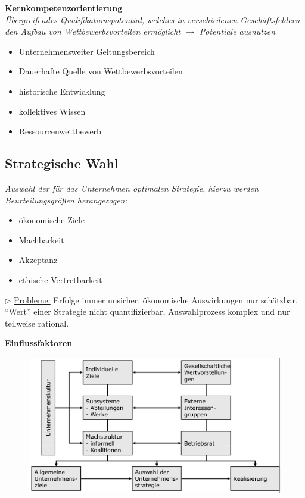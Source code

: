 \documentclass[a4paper,11pt, twoside]{article}
\begin{document}
\textbf{Kernkompetenzorientierung}\\ 
\textit{Übergreifendes Qualifikationspotential, welches in verschiedenen Geschäftsfeldern den Aufbau von Wettbewerbsvorteilen ermöglicht $\rightarrow$ Potentiale ausnutzen}
\begin{itemize}
	\item Unternehmensweiter Geltungsbereich
	\item Dauerhafte Quelle von Wettbewerbsvorteilen
	\item historische Entwicklung
	\item kollektives Wissen
	\item Ressourcenwettbewerb
\end{itemize}

\subsection{Strategische Wahl}
\textit{Auswahl der für das Unternehmen optimalen Strategie, hierzu werden Beurteilungsgrößen herangezogen:}
\begin{itemize}
	\item ökonomische Ziele
	\item Machbarkeit
	\item Akzeptanz
	\item ethische Vertretbarkeit
\end{itemize}
$\triangleright$ \underline{Probleme:} Erfolge immer unsicher, ökonomische Auswirkungen nur schätzbar, "`Wert"' einer Strategie nicht quantifizierbar, Auswahlprozess komplex und nur teilweise rational.
 
\newpage
\textbf{Einflussfaktoren}
\begin{figure}[h]
 \begin{center}
   \includegraphics[scale=0.2]{bilder/strategische_einflussfaktoren.png}
 \end{center}
\end{figure}
\end{document}
